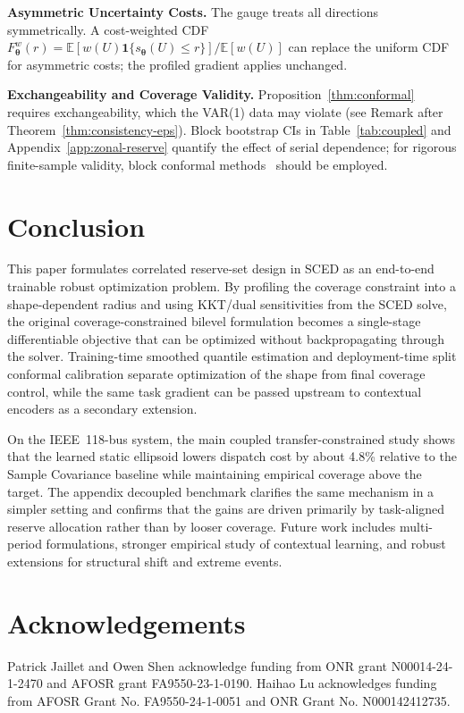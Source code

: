 \documentclass[11pt]{article}
\newcommand{\E}{\mathbb{E}}
\newcommand{\btheta}{\bm{\theta}}
\theoremstyle{definition}
\begin{document}
\textbf{Asymmetric Uncertainty Costs.} The gauge treats all directions symmetrically. A cost-weighted CDF $F_{\btheta}^w(r) = \E[w(U)\mathbf{1}\{s_{\btheta}(U)\le r\}]/\E[w(U)]$ can replace the uniform CDF for asymmetric costs; the profiled gradient applies unchanged.

\textbf{Exchangeability and Coverage Validity.} Proposition~\ref{thm:conformal} requires exchangeability, which the VAR(1) data may violate (see Remark after Theorem~\ref{thm:consistency-eps}). Block bootstrap CIs in Table~\ref{tab:coupled} and Appendix~\ref{app:zonal-reserve} quantify the effect of serial dependence; for rigorous finite-sample validity, block conformal methods~\citep{barber2023conformal} should be employed.

\section{Conclusion}
\label{sec:conclusion}

This paper formulates correlated reserve-set design in SCED as an end-to-end trainable robust optimization problem. By profiling the coverage constraint into a shape-dependent radius and using KKT/dual sensitivities from the SCED solve, the original coverage-constrained bilevel formulation becomes a single-stage differentiable objective that can be optimized without backpropagating through the solver. Training-time smoothed quantile estimation and deployment-time split conformal calibration separate optimization of the shape from final coverage control, while the same task gradient can be passed upstream to contextual encoders as a secondary extension.

On the IEEE~118-bus system, the main coupled transfer-constrained study shows that the learned static ellipsoid lowers dispatch cost by about 4.8\% relative to the Sample Covariance baseline while maintaining empirical coverage above the target. The appendix decoupled benchmark clarifies the same mechanism in a simpler setting and confirms that the gains are driven primarily by task-aligned reserve allocation rather than by looser coverage. Future work includes multi-period formulations, stronger empirical study of contextual learning, and robust extensions for structural shift and extreme events.

\section*{Acknowledgements}
Patrick Jaillet and Owen Shen acknowledge funding from ONR grant N00014-24-1-2470 and AFOSR grant FA9550-23-1-0190. Haihao Lu acknowledges funding from AFOSR Grant No. FA9550-24-1-0051 and ONR Grant No. N000142412735.
\end{document}
